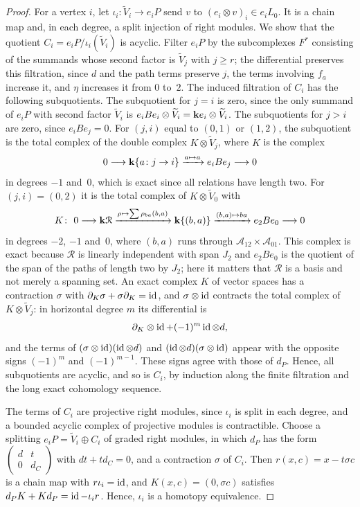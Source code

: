 \begin{proof}
  For a vertex $i$, let ${\iota_i\colon\widetilde{V}_i\to e_iP}$ send $v$ to
  ${(e_i\otimes v)_i\in e_iL_0}$. It is a chain map and, in each degree, a split
  injection of right modules. We show that the quotient
  ${C_i=e_iP/\iota_i(\widetilde{V}_i)}$ is acyclic. Filter $e_iP$ by the
  subcomplexes $F^r$ consisting of the summands whose second factor is
  $\widetilde{V}_j$ with ${j\geq r}$; the differential preserves this filtration,
  since $d$ and the path terms preserve $j$, the terms involving $f_a$ increase
  it, and $\eta$ increases it from $0$ to~$2$. The induced filtration of $C_i$
  has the following subquotients. The subquotient for ${j=i}$ is zero, since the
  only summand of $e_iP$ with second factor $\widetilde{V}_i$ is
  ${e_iBe_i\otimes\widetilde{V}_i=\mathbf{k} e_i\otimes\widetilde{V}_i}$. The
  subquotients for ${j>i}$ are zero, since ${e_iBe_j=0}$. For $(j,i)$ equal to
  $(0,1)$ or $(1,2)$, the subquotient is the total complex of the double
  complex ${K\otimes\widetilde{V}_j}$, where $K$ is the complex
  \[
    0\longrightarrow\mathbf{k}\{a\colon j\to i\}\xrightarrow{a\mapsto a}
    e_iBe_j\longrightarrow0
  \]
  in degrees ${-1}$ and~$0$, which is exact since all relations have length two.
  For ${(j,i)=(0,2)}$ it is the total complex of ${K\otimes\widetilde{V}_0}$ with
  \[
    K\colon\ 0\longrightarrow\kk\mathcal{R}
    \xrightarrow{\rho\mapsto\sum\rho_{ba}(b,a)}
    \kk\{(b,a)\}\xrightarrow{(b,a)\mapsto ba}e_2Be_0\longrightarrow0
  \]
  in degrees ${-2}$, ${-1}$ and~$0$, where $(b,a)$ runs through
  ${\mathcal{A}_{12}\times\mathcal{A}_{01}}$. This complex is exact because
  $\mathcal{R}$ is linearly independent with span $J_2$ and $e_2Be_0$ is the
  quotient of the span of the paths of length two by $J_2$; here it matters
  that $\mathcal{R}$ is a basis and not merely a spanning set. An exact complex
  $K$ of vector spaces has a contraction $\sigma$ with
  ${\partial_K\sigma+\sigma\partial_K=\id}$, and ${\sigma\otimes\id}$ contracts the
  total complex of ${K\otimes\widetilde{V}_j}$: in horizontal degree $m$ its
  differential is
  \[
    \partial_K\otimes\id+(-1)^m\id\otimes d,
  \]
  and the terms of
  ${(\sigma\otimes\id)(\id\otimes d)}$ and ${(\id\otimes d)(\sigma\otimes\id)}$
  appear with the opposite signs ${(-1)^m}$ and ${(-1)^{m-1}}$. These signs agree
  with those of $d_P$. Hence, all subquotients are acyclic, and so is $C_i$, by
  induction along the finite filtration and the long exact cohomology sequence.

  The terms of $C_i$ are projective right modules, since $\iota_i$ is split in
  each degree, and a bounded acyclic complex of projective modules is
  contractible. Choose a splitting ${e_iP=\widetilde{V}_i\oplus C_i}$ of graded
  right modules, in which $d_P$ has the form
  $\left(\begin{smallmatrix}d&t\\0&d_C\end{smallmatrix}\right)$ with
  ${dt+td_C=0}$, and a contraction $\sigma$ of $C_i$. Then
  ${r(x,c)=x-t\sigma c}$ is a chain map with ${r\iota_i=\id}$, and ${K(x,c)=(0,\sigma
  c)}$ satisfies ${d_PK+Kd_P=\id-\iota_ir}$. Hence, $\iota_i$ is a homotopy
  equivalence.


\end{proof}
